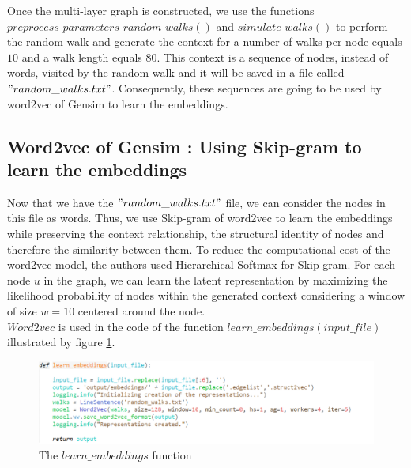 \documentclass[a4paper,13pt]{article}
\begin{document}
Once the multi-layer graph is constructed, we use the functions $preprocess\_parameters\_random\_walks()$ and $simulate\_walks()$ to perform the random walk and generate the context for a number of walks per node equals $10$ and a walk length equals $80$. This context is a sequence of nodes, instead of words, visited by the random walk and it will be saved in a file called $"random\_walks.txt"$. Consequently, these sequences are going to be used by word2vec of Gensim to learn the embeddings.
 
\subsection{Word2vec of Gensim : Using Skip-gram to learn the embeddings}
Now that we have the $"random\_walks.txt"$ file, we can consider the nodes in this file as words. Thus, we use Skip-gram of word2vec to learn the embeddings while preserving the context relationship, the structural identity of nodes and therefore the similarity between them. To reduce the computational cost of the word2vec model, the authors used Hierarchical Softmax for Skip-gram.
For each node $u$ in the graph, we can learn the latent representation by maximizing the likelihood probability of nodes within the generated context considering a window of size $w=10$ centered around the node. \\
$Word2vec$ is used in the code of the function $learn\_embeddings(input\_file)$ illustrated by figure \ref{fig:learn}.
\FloatBarrier
\begin{figure}[H]
  \includegraphics[width=\textwidth, scale=0.7]{screen-shots/lean_emb.PNG}
  \centering
  \caption{The $learn\_embeddings$ function}
  \label{fig:learn}
\end{figure}
\end{document}
